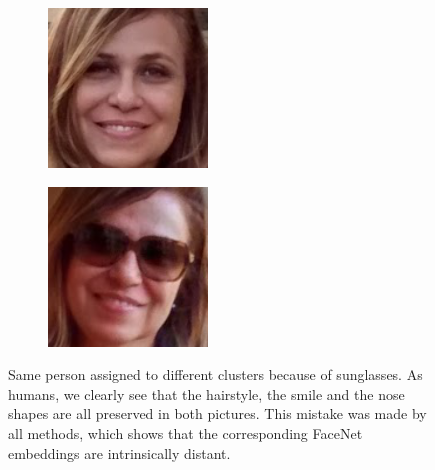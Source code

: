 \documentclass[conference]{IEEEtran}
\begin{document}
\begin{figure}
  \centering
  \begin{subfigure}[b]{0.2\textwidth}
    \includegraphics[width=\linewidth]{wrong_split_a}
  \end{subfigure}
  \begin{subfigure}[b]{0.2\textwidth}
    \includegraphics[width=\linewidth]{wrong_split_b}
  \end{subfigure}
  \caption{Same person assigned to different clusters because of sunglasses. As humans, we clearly see that the hairstyle, the smile and the nose shapes are all preserved in both pictures. This mistake was made by all methods, which shows that the corresponding FaceNet embeddings are intrinsically distant.}
  \label{wrong_split}
\end{figure}
\end{document}
